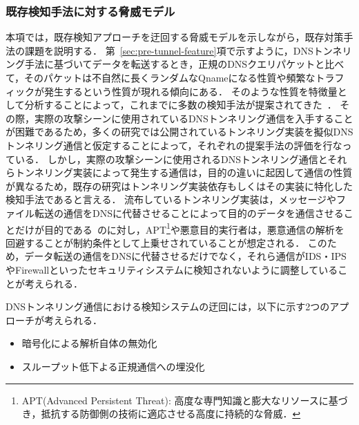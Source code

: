\subsubsection{既存検知手法に対する脅威モデル}
\label{sec:bypass-method}
本項では，既存検知アプローチを迂回する脅威モデルを示しながら，既存対策手法の課題を説明する．
第~\ref{sec:pre-tunnel-feature}項で示すように，DNSトンネリング手法に基づいてデータを転送するとき，正規のDNSクエリパケットと比べて，そのパケットは不自然に長くランダムなQnameになる性質や頻繁なトラフィックが発生するという性質が現れる傾向にある．
そのような性質を特徴量として分析することによって，これまでに多数の検知手法が提案されてきた~\cite{born, cheng, liu, asaf, steadman, jawad}．
その際，実際の攻撃シーンに使用されているDNSトンネリング通信を入手することが困難であるため，多くの研究では公開されているトンネリング実装を擬似DNSトンネリング通信と仮定することによって，それぞれの提案手法の評価を行なっている．
しかし，実際の攻撃シーンに使用されるDNSトンネリング通信とそれらトンネリング実装によって発生する通信は，目的の違いに起因して通信の性質が異なるため，既存の研究はトンネリング実装依存もしくはその実装に特化した検知手法であると言える．
流布しているトンネリング実装は，メッセージやファイル転送の通信をDNSに代替させることによって目的のデータを通信させることだけが目的である~\cite{iodine}のに対し，APT\footnote{APT(Advanced Persistent Threat): 高度な専門知識と膨大なリソースに基づき，抵抗する防御側の技術に適応させる高度に持続的な脅威\cite{APT}．}や悪意目的実行者は，悪意通信の解析を回避することが制約条件として上乗せされていることが想定される．
このため，データ転送の通信をDNSに代替させるだけでなく，それら通信がIDS・IPSやFirewallといったセキュリティシステムに検知されないように調整していることが考えられる．

DNSトンネリング通信における検知システムの迂回には，以下に示す2つのアプローチが考えられる．
\vspace{-5pt}
\begin{itemize}
 \item 暗号化による解析自体の無効化
 \vspace{-5pt}
 \item スループット低下よる正規通信への埋没化
\end{itemize}

